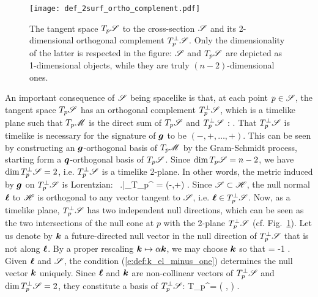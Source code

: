 \begin{figure}
\centerline{\texttt{[image: def\_2surf\_ortho\_complement.pdf]}}
\caption[]{\label{f:def:TS_ortho} \footnotesize
The tangent space $T_p\mathscr{S}$ to the cross-section $\mathscr{S}$ and its 2-dimensional
orthogonal complement
$T_p^\perp\mathscr{S}$. Only the dimensionality of the latter is respected in
the figure: $\mathscr{S}$ and $T_p\mathscr{S}$ are depicted as 1-dimensional
objects, while they are truly $(n-2)$-dimensional ones.}
\end{figure}

An important consequence of $\mathscr{S}$ being spacelike is that, at each point
$p\in \mathscr{S}$, the tangent space $T_p\mathscr{S}$ has an orthogonal complement
$T_p^\perp\mathscr{S}$,  which is a timelike plane such that
$T_p\mathscr{M}$ is the direct sum of $T_p\mathscr{S}$ and $T_p^\perp\mathscr{S}$ :
\be \label{e:def:TM_direct_sum}
   .
\ee
That $T_p^\perp\mathscr{S}$ is timelike is necessary for the signature of $\bm{g}$
to be $(-,+,\ldots,+)$. This can be seen by constructing an $\bm{g}$-orthogonal
basis of $T_p\mathscr{M}$ by the Gram-Schmidt process, starting form a
$\bm{q}$-orthogonal basis of $T_p\mathscr{S}$. Since $\dim T_p\mathscr{S} = n-2$, we have
$\dim T_p^\perp\mathscr{S} = 2$, i.e. $T_p^\perp\mathscr{S}$ is a timelike 2-plane.
In other words, the metric induced by $\bm{g}$ on
$T_p^\perp\mathscr{S}$ is Lorentzian:
\be
    \, \left.\right|_{T_p^\perp\Sp} = (-,+) .
\ee
Since $\mathscr{S}\subset\mathscr{H}$, the null normal $\bm{\ell}$ to $\mathscr{H}$ is orthogonal to any vector
tangent to $\mathscr{S}$, i.e. $\bm{\ell} \in T_p^\perp\mathscr{S}$.
Now, as a timelike plane, $T_p^\perp\mathscr{S}$ has two independent null directions,
which can be seen as the two intersections of the null cone at $p$ with
the 2-plane $T_p^\perp\mathscr{S}$ (cf. Fig.~\ref{f:def:TS_ortho}).
Let us denote by $\bm{k}$ a future-directed null vector in the null direction of $T_p^\perp\mathscr{S}$
that is not along $\bm{\ell}$. By a proper rescaling $\bm{k}\mapsto \alpha\bm{k}$,
we may choose $\bm{k}$ so that
\be \label{e:def:k_el_minus_one}
        \cdot\wl = -1 .
\ee
Given $\bm{\ell}$ and $\mathscr{S}$, the condition (\ref{e:def:k_el_minus_one})
determines the null vector $\bm{k}$ uniquely.
Since $\bm{\ell}$ and $\bm{k}$ are non-collinear vectors of $T_p^\perp\mathscr{S}$ and
$\dim T_p^\perp\mathscr{S} = 2$, they constitute a basis of $T_p^\perp\mathscr{S}$:
\be \label{e:def:TSperp_Span_k_l}
    T_p^\perp\Sp = \left( \wl,  \right) .
\ee

